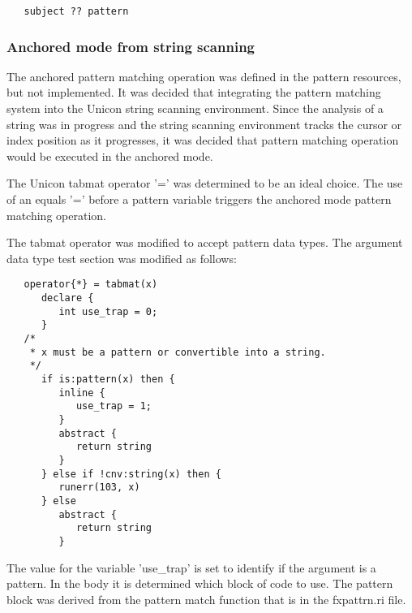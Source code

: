 \documentclass{article}
\begin{document}
\begin{verbatim}
   subject ?? pattern
\end{verbatim}

\subsubsection{Anchored mode from string scanning}
The anchored pattern matching operation was defined in the pattern resources, but not implemented.  It was decided that integrating the pattern matching system into the Unicon string scanning environment.  Since the analysis of a string was in progress and the string scanning environment tracks the cursor or index position as it progresses, it was decided that pattern matching operation would be executed in the anchored mode.

The Unicon tabmat operator '=' was determined to be an ideal choice.  The use of an equals '=' before a pattern variable triggers the anchored mode pattern matching operation.

The tabmat operator was modified to accept pattern data types.  The argument data type test section was modified as follows: 

\begin{verbatim}
   operator{*} = tabmat(x)
      declare {
         int use_trap = 0;
      }
   /*
    * x must be a pattern or convertible into a string.
    */
      if is:pattern(x) then {
         inline {
            use_trap = 1;
         }
         abstract {
            return string
         }
      } else if !cnv:string(x) then {
         runerr(103, x)
      } else 
         abstract {
            return string
         }
\end{verbatim}

The value for the variable 'use\_trap' is set to identify if the argument is a pattern.  In the body it is determined which block of code to use.  The pattern block was derived from the pattern match function that is in the fxpattrn.ri file.
\end{document}
